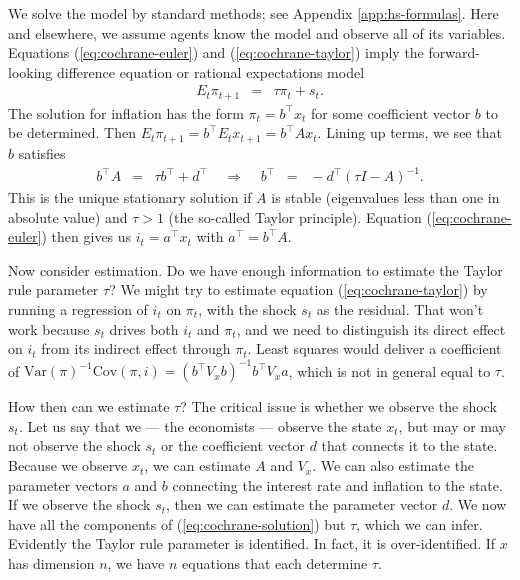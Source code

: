 \documentclass[12pt]{article}
\newcounter{tab}
\begin{document}
{We solve the model by standard methods;
see Appendix \ref{app:hs-formulas}.
Here and elsewhere, we assume agents know the model
and observe all of its variables.
Equations (\ref{eq:cochrane-euler}) and (\ref{eq:cochrane-taylor})
imply the forward-looking difference equation
or rational expectations model
\begin{eqnarray*}
    E_t \pi_{t+1}&=& \tau \pi_t + s_t .
\end{eqnarray*}
The solution for inflation has the form $\pi_t = b^\top x_t $
for some coefficient vector $b$ to be determined.
Then $ E_t \pi_{t+1} = b^\top E_t x_{t+1} = b^\top  A  x_t$.
Lining up terms, we see that $b$ satisfies
\begin{eqnarray}
      b^\top  A   &=& \tau b^\top + d^\top
      \;\;\;\;\Rightarrow \;\;\;\; b^\top \;\;=\;\; - d^\top (\tau I -  A )^{-1}  .
    \label{eq:cochrane-solution}
\end{eqnarray}
This is the unique stationary solution if $ A $ is stable
(eigenvalues less than one in absolute value)
and $\tau> 1$ (the so-called Taylor principle).
Equation (\ref{eq:cochrane-euler}) then gives us
$ i_t = a^\top x_t$ with $a^\top = b^\top A $.


Now consider estimation. Do we have enough information
to estimate the Taylor rule parameter $\tau$?
We might try to estimate equation (\ref{eq:cochrane-taylor})
by running a regression of $i_t$ on $\pi_t$, with the shock $s_t$ as the residual.
That won't work because $s_t$ drives both $i_t$ and $\pi_t$,
and we need to distinguish its direct effect on $i_t$ from its indirect effect through $\pi_t$.
Least squares would deliver a coefficient of
$\mbox{Var}(\pi)^{-1} \mbox{Cov}(\pi,i) = (b^{\top}V_x b)^{-1} b^{\top} V_x a$,
which is not in general equal to $\tau$.

How then can we estimate $\tau$?
The critical issue is whether we observe the shock $s_t$.
Let us say that we --- the economists --- observe the state $x_t$,
but may or may not observe the shock $s_t$ or the coefficient vector $d$ that connects it to
the state.
Because we observe $x_t$, we can estimate $ A $ and $V_x$.
We can also estimate the parameter vectors $a$ and $b$
connecting the interest rate and inflation to the state.
If we observe the shock $s_t$, then we can estimate the parameter vector $d$.
We now have all the components of (\ref{eq:cochrane-solution}) but $\tau$,
which we can infer.
Evidently the Taylor rule parameter is identified.
In fact, it is over-identified.
If $x$ has dimension $n$, we have $n$ equations that each determine $\tau$.

}
\end{document}
